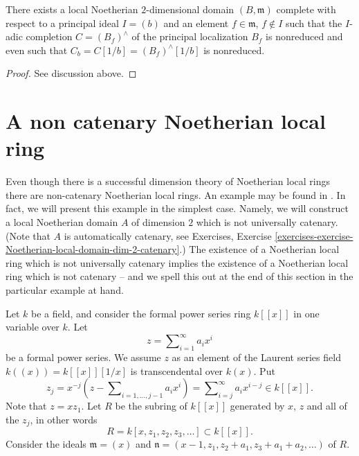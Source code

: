 \begin{lemma}
\label{lemma-nonreduced-recompletion}
There exists a local Noetherian $2$-dimensional domain $(B, \mathfrak m)$
complete with respect to a principal ideal $I = (b)$ and an
element $f \in \mathfrak m$, $f \not \in I$ such that
the $I$-adic completion $C = (B_f)^\wedge$ of the principal
localization $B_f$ is nonreduced and even such that
$C_b = C[1/b] = (B_f)^\wedge[1/b]$ is nonreduced.
\end{lemma}

\begin{proof}
See discussion above.
\end{proof}








\section{A non catenary Noetherian local ring}
\label{section-non-catenary-Noetherian-local}

\noindent
Even though there is a successful dimension theory of Noetherian local rings
there are non-catenary Noetherian local rings. An example may be found in
\cite[Appendix, Example 2]{Nagata}. In fact, we will present this example
in the simplest case. Namely, we will construct a local Noetherian domain $A$
of dimension $2$ which is not universally catenary. (Note that $A$ is
automatically catenary, see
Exercises, Exercise
\ref{exercises-exercise-Noetherian-local-domain-dim-2-catenary}.)
The existence of a Noetherian local ring which is not universally
catenary implies the existence of a Noetherian local ring which
is not catenary -- and we spell this out at the end of this section
in the particular example at hand.

\medskip\noindent
Let $k$ be a field, and consider the formal power series ring
$k[[x]]$ in one variable over $k$. Let
$$
z = \sum\nolimits_{i = 1}^\infty a_i x^i
$$
be a formal power series. We assume $z$ as an element of the Laurent
series field $k((x)) = k[[x]][1/x]$ is transcendental over $k(x)$.
Put
$$
z_j
=
x^{-j}(z - \sum\nolimits_{i = 1, \ldots, j - 1} a_i x^i)
=
\sum\nolimits_{i = j}^\infty a_i x^{i - j}
\in k[[x]].
$$
Note that $z = xz_1$.
Let $R$ be the subring of $k[[x]]$ generated by $x$, $z$ and all of the
$z_j$, in other words
$$
R = k[x, z_1, z_2, z_3, \ldots ] \subset k[[x]].
$$
Consider the ideals $\mathfrak m = (x)$ and
$\mathfrak n = (x - 1, z_1, z_2 + a_1, z_3 + a_1 + a_2, \ldots)$ of $R$.

